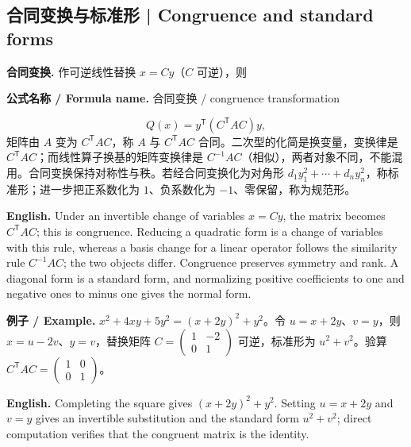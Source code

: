 \documentclass[UTF8,11pt,a4paper]{ctexart}
\newcommand{\EN}[1]{\par\noindent\textbf{English.} #1\par}
\newcommand{\FORMULA}[2]{\par\noindent\textbf{公式名称 / Formula name.} #1 / #2\par}
\newcommand{\EX}[2]{\par\noindent\textbf{例子 / Example.} #1\par\EN{#2}}
\begin{document}
\subsection{合同变换与标准形 | Congruence and standard forms}
\noindent\textbf{合同变换.} 作可逆线性替换 $x=Cy$（$C$ 可逆），则
\FORMULA{合同变换}{congruence transformation}
\[
Q(x)=y^{\mathsf T}(C^{\mathsf T}AC)y,
\]
矩阵由 $A$ 变为 $C^{\mathsf T}AC$，称 $A$ 与 $C^{\mathsf T}AC$ 合同。二次型的化简是换变量，变换律是 $C^{\mathsf T}AC$；而线性算子换基的矩阵变换律是 $C^{-1}AC$（相似），两者对象不同，不能混用。合同变换保持对称性与秩。若经合同变换化为对角形 $d_1y_1^2+\cdots+d_ny_n^2$，称标准形；进一步把正系数化为 $1$、负系数化为 $-1$、零保留，称为规范形。
\EN{Under an invertible change of variables $x=Cy$, the matrix becomes $C^{\mathsf T}AC$; this is congruence. Reducing a quadratic form is a change of variables with this rule, whereas a basis change for a linear operator follows the similarity rule $C^{-1}AC$; the two objects differ. Congruence preserves symmetry and rank. A diagonal form is a standard form, and normalizing positive coefficients to one and negative ones to minus one gives the normal form.}
\EX{$x^2+4xy+5y^2=(x+2y)^2+y^2$。令 $u=x+2y$、$v=y$，则 $x=u-2v$、$y=v$，替换矩阵 $C=\begin{pmatrix}1&-2\\0&1\end{pmatrix}$ 可逆，标准形为 $u^2+v^2$。验算 $C^{\mathsf T}AC=\begin{pmatrix}1&0\\0&1\end{pmatrix}$。}{Completing the square gives $(x+2y)^2+y^2$. Setting $u=x+2y$ and $v=y$ gives an invertible substitution and the standard form $u^2+v^2$; direct computation verifies that the congruent matrix is the identity.}
\end{document}
